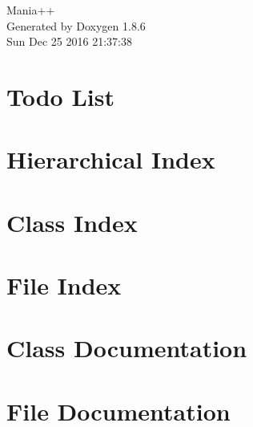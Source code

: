\documentclass[twoside]{book}
\newcommand{\clearemptydoublepage}{%
  \newpage{\pagestyle{empty}\cleardoublepage}%
}
\begin{document}
\hypersetup{pageanchor=false}
\begin{titlepage}
\vspace*{7cm}
\begin{center}%
{\Large Mania++ }\\
\vspace*{1cm}
{\large Generated by Doxygen 1.8.6}\\
\vspace*{0.5cm}
{\small Sun Dec 25 2016 21:37:38}\\
\end{center}
\end{titlepage}
\clearemptydoublepage
\tableofcontents
\clearemptydoublepage
{}
\hypersetup{pageanchor=true}

\chapter{Todo List}
\label{todo}
\hypertarget{todo}{}

\chapter{Hierarchical Index}

\chapter{Class Index}

\chapter{File Index}

\chapter{Class Documentation}



















\chapter{File Documentation}

























\newpage
{}
{}
\printindex
\end{document}
